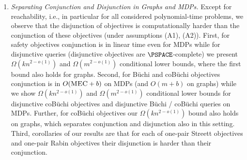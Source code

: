 \documentclass[11pt,letterpaper]{article}
\newif\iffullversion
\newcommand{\infull}[1]{\iffullversion #1\fi}
\newcommand{\inshort}[1]{\iffullversion \else #1\fi}
\begin{document}
\begin{enumerate}
\begin{enumerate}
\item
\emph{Separating Conjunction and Disjunction in Graphs and MDPs.}
		Except for reachability, i.e., in particular for all considered 
		polynomial-time problems, we observe that the disjunction of objectives is
		computationally harder than the conjunction of these objectives (under assumptions (A1), (A2)).
		First, for safety objectives conjunction is in linear time even for MDPs
		while for disjunctive queries (disjunctive objectives are $\PSPACE$-complete)
		we present $\Omega(kn^{2-o(1)})$ and $\Omega(m^{2-o(1)})$ conditional lower bounds, where the 
		first bound also holds for graphs.
		Second, for Büchi and coBüchi objectives conjunction is in $O(\textsc{MEC} + b)$ on MDPs
		(and $O(m+b)$ on graphs) while 
		we show $\Omega(kn^{2-o(1)})$ and $\Omega(m^{2-o(1)})$ conditional lower bounds for 
		disjunctive coBüchi objectives and disjunctive Büchi / coBüchi queries on MDPs.
		\infull{The $\Omega(m^{2-o(1)})$ bound even holds for the disjunction of singleton coBüchi
		objectives. }Further, for coBüchi objectives our $\Omega(kn^{2-o(1)})$ bound also holds on graphs,
		which separates conjunction and disjunction also in this setting.
		Third, \infull{we can also see the results for Streett and Rabin objectives 
		as a separation between conjunction and disjunction. Recall that Streett 
		objectives are the conjunction of one-pair Streett objectives and 
		Rabin objectives are the disjunction of one-pair Rabin objectives.
		Further, both Büchi and coBüchi objectives are special cases of each of 
		one-pair Streett and one-pair Rabin objectives. In particular the following
		separations are easy observations or corollaries of our results:
		For the disjunction of one-pair Streett objectives the same conditional 
		lower bounds (and the same upper bound, see Observation~\ref{obs:disjStreett}) as 
		for the disjunction of coBüchi objectives apply.
		Thus the disjunction of one-pair Streett objectives is harder than the 
		conjunction of one-pair Streett objectives (under assumptions (A1)/(A2)).
		The conjunction of one-pair Rabin objectives can be solved in the same time 
		as conjunctive Büchi objectives. Thus also the disjunction of one-pair 
		Rabin objectives is harder than their conjunction.}
		\inshort{corollaries of our results are that
		for each of one-pair Streett objectives and one-pair Rabin objectives their
		disjunction is harder than their conjunction.}
	\end{enumerate}
\end{enumerate}
\end{document}
